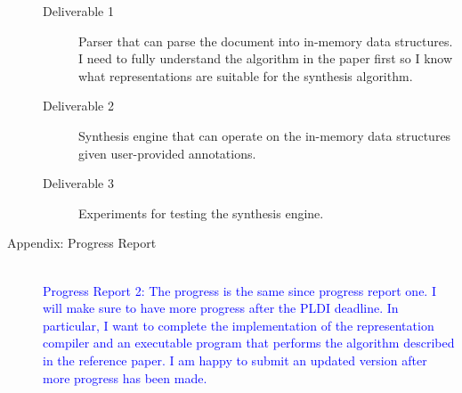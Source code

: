 \documentclass[12pt,a4paper]{article}
\begin{document}
\begin{description}
\begin{description}
        \item[Deliverable 1] Parser that can parse the document into in-memory data structures. I need to fully understand the algorithm in the paper first so I know what representations are suitable for the synthesis algorithm.
        
        \item[Deliverable 2] Synthesis engine that can operate on the in-memory data structures given user-provided annotations.

        \item[Deliverable 3] Experiments for testing the synthesis engine.
    \end{description}

\item[Appendix: Progress Report]\text{}\\

\textcolor{blue}{Progress Report 2: The progress is the same since progress report one. I will make sure to have more progress after the PLDI deadline. In particular, I want to complete the implementation of the representation compiler and an executable program that performs the algorithm described in the reference paper. I am happy to submit an updated version after more progress has been made.} 


\end{description}
\end{document}
